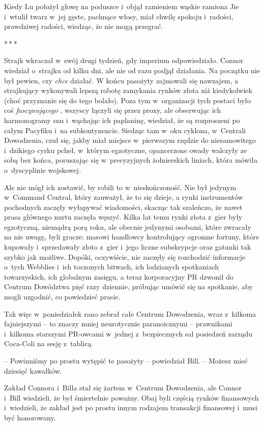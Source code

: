 \documentclass[oneside,polish,11pt,rmheadings]{mwbk}
\newcommand{\threeast}{\par\centerline{*\,*\,*}\medskip\par}
\begin{document}
Kiedy Lu położył głowę na poduszce i~objął ramieniem wąskie ramiona Jie i~wtulił twarz w~jej gęste, pachnące włosy, miał chwilę spokoju i~radości, prawdziwej radości, wiedząc, że nie mogą przegrać.

\bigskip
\threeast

Strajk wkraczał w~swój drugi tydzień, gdy imperium odpowiedziało. Connor wiedział o~strajku od kilku dni, ale nie od razu podjął działania. Na początku nie był pewien, czy \textit{chce }działać. W końcu pasożyty zajmowali się nawzajem, a strajkujący wykonywali lepszą robotę zamykania rynków złota niż kiedykolwiek (choć przyznanie się do tego bolało). Poza tym w~organizacji tych postaci było coś \textit{fascynującego }, wszyscy łączyli się przez proxy, ale obserwując ich harmonogramy snu i~wąchając ich paplaninę, wiedział, że są rozproszeni po całym Pacyfiku i~na subkontynencie. Siedząc tam w~oku cyklona, w~Centrali Dowodzenia, czuł się, jakby miał miejsce w~pierwszym rzędzie do niesamowitego i~dzikiego cyrku pcheł, w~którym egzotyczne, opancerzone owady walczyły ze sobą bez końca, poruszając się w~precyzyjnych żołnierskich liniach, która mówiła o~dyscyplinie wojskowej.

Ale nie mógł ich zostawić, by robili to w~nieskończoność. Nie był jedynym w~Command Central, który zauważył, że to się dzieje, a rynki instrumentów pochodnych zaczęły wyłapywać wiadomości, skacząc tak szaleńczo, że nawet prasa głównego nurtu zaczęła węszyć. Kilka lat temu rynki złota z~gier były egzotyczną, niemądrą porą roku, ale obecnie jedynymi osobami, które zwracały na nie uwagę, byli gracze: masowi handlowcy kontrolujący ogromne fortuny, które kupowały i~sprzedawały złoto z~gier i~jego liczne subskrypcje oraz gatunki tak szybko jak możliwe. Dopóki, oczywiście, nie zaczęły się rozchodzić informacje o~tych Webblies i~ich toczonych bitwach, ich lodzianych spotkaniach towarzyskich, ich globalnym zasięgu, a teraz korporacyjny PR dzwonił do Centrum Dowództwa pięć razy dziennie, próbując umówić się na spotkanie, aby mogli uzgodnić, co powiedzieć prasie.

Tak więc w~poniedziałek rano zebrał całe Centrum Dowodzenia, wraz z~kilkoma fajniejszymi -- to znaczy mniej neurotycznie paranoicznymi -- prawnikami i~kilkoma starszymi PR-owcami w~jednej z~bezpiecznych sal posiedzeń zarządu Coca-Coli na sesję z~tablicą.

-- Powinniśmy po prostu wytępić te pasożyty -- powiedział Bill. -- Możesz mieć dziesięć kawałków. 

 Zakład Connora i~Billa stał się żartem w~Centrum Dowodzenia, ale Connor i~Bill wiedzieli, że był śmiertelnie poważny. Obaj byli częścią rynków finansowych i~wiedzieli, że zakład jest po prostu innym rodzajem transakcji finansowej i~musi być honorowany.
\end{document}
